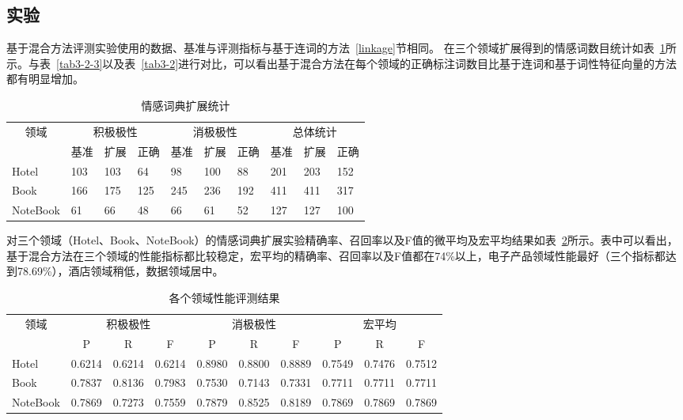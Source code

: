 \subsection{实验}
基于混合方法评测实验使用的数据、基准与评测指标与基于连词的方法~\ref{linkage}节相同。
在三个领域扩展得到的情感词数目统计如表~\ref{tab3-3}所示。与表~\ref{tab3-2-3}以及表~\ref{tab3-2}进行对比，可以看出基于混合方法在每个领域的正确标注词数目比基于连词和基于词性特征向量的方法都有明显增加。
\begin{table}[htp]
\centering
\caption{情感词典扩展统计}
\label{tab3-3}
\begin{tabular}{|l|l|l|l|l|l|l|l|l|l|}
\hline
\multicolumn{1}{|c|}{\multirow{2}{*}{领域}} & \multicolumn{3}{c|}{积极极性} & \multicolumn{3}{c|}{消极极性} & \multicolumn{3}{c|}{总体统计} \\ \cline{2-10} 
\multicolumn{1}{|c|}{} & \multicolumn{1}{c|}{基准} & \multicolumn{1}{c|}{扩展} & \multicolumn{1}{c|}{正确} & \multicolumn{1}{c|}{基准} & \multicolumn{1}{c|}{扩展} & \multicolumn{1}{c|}{正确} & \multicolumn{1}{c|}{基准} & \multicolumn{1}{c|}{扩展} & \multicolumn{1}{c|}{正确} \\ \hline
Hotel & 103 & 103 & 64 & 98 & 100 & 88 & 201 & 203 & 152 \\ \hline
Book & 166 & 175 & 125 & 245 & 236 & 192 & 411 & 411 & 317 \\ \hline
NoteBook & 61 & 66 & 48 & 66 & 61 & 52 & 127 & 127 & 100 \\ \hline
\end{tabular}
\end{table}

对三个领域（Hotel、Book、NoteBook）的情感词典扩展实验精确率、召回率以及F值的微平均及宏平均结果如表~\ref{tab3-4}所示。表中可以看出，基于混合方法在三个领域的性能指标都比较稳定，宏平均的精确率、召回率以及F值都在74\%以上，电子产品领域性能最好（三个指标都达到78.69\%），酒店领域稍低，数据领域居中。
\begin{table}[htp]
\centering
\caption{各个领域性能评测结果}
\label{tab3-4}
\begin{tabular}{|l|l|l|l|l|l|l|l|l|l|}
\hline
\multicolumn{1}{|c|}{\multirow{2}{*}{领域}} & \multicolumn{3}{c|}{积极极性} & \multicolumn{3}{c|}{消极极性} & \multicolumn{3}{c|}{宏平均} \\ \cline{2-10} 
\multicolumn{1}{|c|}{} & \multicolumn{1}{c|}{P} & \multicolumn{1}{c|}{R} & \multicolumn{1}{c|}{F} & \multicolumn{1}{c|}{P} & \multicolumn{1}{c|}{R} & \multicolumn{1}{c|}{F} & \multicolumn{1}{c|}{P} & \multicolumn{1}{c|}{R} & \multicolumn{1}{c|}{F} \\ \hline
Hotel & 0.6214 & 0.6214 & 0.6214 & 0.8980 & 0.8800 & 0.8889 & 0.7549 & 0.7476 & 0.7512 \\ \hline
Book & 0.7837 & 0.8136 & 0.7983 & 0.7530 & 0.7143 & 0.7331 & 0.7711 & 0.7711 & 0.7711 \\ \hline
NoteBook & 0.7869 & 0.7273 & 0.7559 & 0.7879 & 0.8525 & 0.8189 & 0.7869 & 0.7869 & 0.7869 \\ \hline
\end{tabular}
\end{table}

